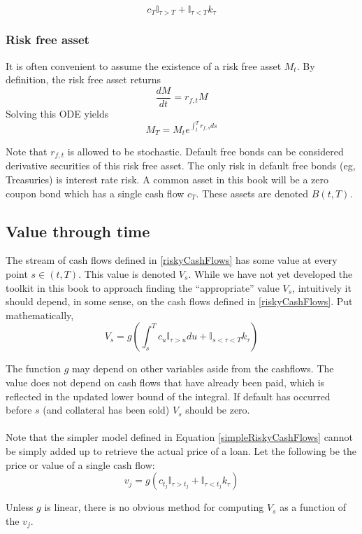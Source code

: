 \documentclass{article}
\theoremstyle{definition}
\begin{document}
\begin{equation} \label{simpleRiskyCashFlows}
c_T \mathbb{I}_{\tau>T}+\mathbb{I}_{\tau<T} k_\tau
\end{equation}


\subsubsection{Risk free asset} \label{rfasset}

It is often convenient to assume the existence of a risk free asset \(M_t\).  By definition, the risk free asset returns
\[\frac{dM}{dt}=r_{f, t} M\]
Solving this ODE yields
\[M_T=M_t e^{\int_t ^T r_{f, s} ds}\]

Note that \(r_{f, t}\) is allowed to be stochastic.  Default free bonds can be considered derivative securities of this risk free asset.  The only risk in default free bonds (eg, Treasuries) is interest rate risk.  A common asset in this book will be a zero coupon bond which has a single cash flow \(c_T\).  These assets are denoted \(B(t, T)\). 

\subsection{Value through time}
\label{valOfCashFlows}
The stream of cash flows defined in \ref{riskyCashFlows} has some value at every point \(s \in (t, T)\).  This value is denoted \(V_s\).  While we have not yet developed the toolkit in this book to approach finding the ``appropriate'' value \(V_s\), intuitively it should depend, in some sense, on the cash flows defined in \ref{riskyCashFlows}.  Put mathematically, 
\[V_s=g\left(   \int_s ^ T c_u \mathbb{I}_{\tau>u} du+\mathbb{I}_{s<\tau<T} k_\tau  \right) \]

The function \(g\) may depend on other variables aside from the cashflows.  The value does not depend on cash flows that have already been paid, which is reflected in the updated lower bound of the integral.  If default has occurred before \(s\) (and collateral has been sold) \(V_s\) should be zero.
\\
\\
Note that the simpler model defined in Equation \ref{simpleRiskyCashFlows} cannot be simply added up to retrieve the actual price of a loan.  Let the following be the price or value of a single cash flow:
\[
v_j= g\left(c_{t_j} \mathbb{I}_{\tau>t_j}+\mathbb{I}_{\tau<t_j} k_\tau\right)
\]

Unless \(g\) is linear, there is no obvious method for computing \(V_s\) as a function of the \(v_j\).
\end{document}
